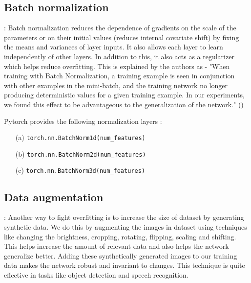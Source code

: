     \subsection{Batch normalization} : Batch normalization reduces the dependence of gradients on the scale of the parameters or on their initial values (reduces internal covariate shift) by fixing the means and variances of layer inputs.
    It also allows each layer to learn independently of other layers. 
    In addition to this, it also acts as a regularizer which helps reduce overfitting.
    This is explained by the authors as - 
    "When training with Batch Normalization, a training example is seen in conjunction with other examples in the mini-batch, and the training network no longer producing deterministic values for a given training example. 
    In our experiments, we found this effect to be advantageous to the generalization of the network." (\cite{DBLP:journals/corr/IoffeS15})
    
    Pytorch provides the following normalization layers :
    \begin{itemize}
        \item[(a)] \texttt{torch.nn.BatchNorm1d(num\_features)}
        \item[(b)] \texttt{torch.nn.BatchNorm2d(num\_features)}
        \item[(c)] \texttt{torch.nn.BatchNorm3d(num\_features)}
    \end{itemize}
    \subsection{Data augmentation} : Another way to fight overfitting is to increase the size of dataset by generating synthetic data. 
    We do this by augmenting the images in dataset using techniques like changing the brightness, cropping, rotating, flipping, scaling and shifting. 
    This helps increase the amount of relevant data and also helps the network generalize better. 
    Adding these synthetically generated images to our training data makes the network robust and invariant to changes. This technique is quite effective in tasks like object detection and speech recognition.
    
